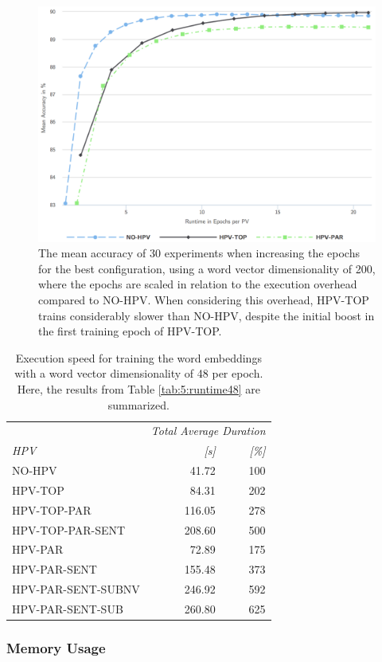 \begin{figure}
	\centering
	\includegraphics[width=1.0\textwidth]{5experiments/epochs-vs-accuracy-200-scaled.png}
	\caption{The mean accuracy of 30 experiments when increasing the epochs for the best configuration, using a word vector dimensionality of 200, where the epochs are scaled in relation to the execution overhead compared to NO-HPV. When considering this overhead, HPV-TOP trains considerably slower than NO-HPV, despite the initial boost in the first training epoch of HPV-TOP.}
	\label{fig:5:epochs-vs-accuracy-200-scaled}
\end{figure}

\begin{table}
	\centering
	\caption{Execution speed for training the word embeddings with a word vector dimensionality of 48 per epoch. Here, the results from Table \ref{tab:5:runtime48} are summarized.}
	\label{tab:5:runtime48-totals}
	\begin{tabular}{lrr}
		\toprule
		&  \multicolumn{2}{r}{\emph{Total Average Duration}}\tabularnewline
		\emph{HPV}& \emph{[s]} & \emph{[\%]}\tabularnewline
		\midrule
		NO-HPV& 41.72& 100\tabularnewline
		HPV-TOP& 84.31& 202\tabularnewline
		HPV-TOP-PAR& 116.05& 278\tabularnewline
		HPV-TOP-PAR-SENT& 208.60& 500\tabularnewline
		HPV-PAR& 72.89& 175\tabularnewline
		HPV-PAR-SENT& 155.48& 373\tabularnewline
		HPV-PAR-SENT-SUBNV& 246.92& 592\tabularnewline
		HPV-PAR-SENT-SUB& 260.80& 625\tabularnewline
		\bottomrule
	\end{tabular}
\end{table}


\subsubsection{Memory Usage}

